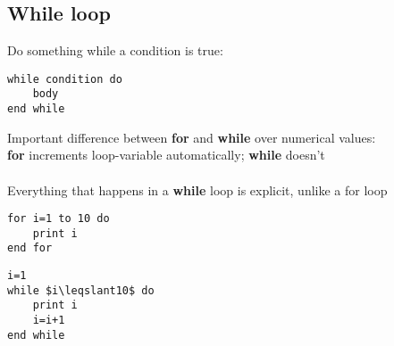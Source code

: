\documentclass{article}[18pt]
\begin{document}
\subsection{While loop}
Do something while a condition is true:
\begin{lstlisting}[mathescape=true]
while condition do
	body
end while
\end{lstlisting}
Important difference between \textbf{for} and \textbf{while} over numerical values:\\
\textbf{for} increments loop-variable automatically; \textbf{while} doesn't\\
\\
Everything that happens in a \textbf{while} loop is explicit, unlike a for loop\\

\begin{lstlisting}[mathescape=true]
for i=1 to 10 do
	print i
end for
\end{lstlisting}
\begin{lstlisting}[mathescape=true]
i=1
while $i\leqslant10$ do
	print i
	i=i+1
end while
\end{lstlisting}
\end{document}
